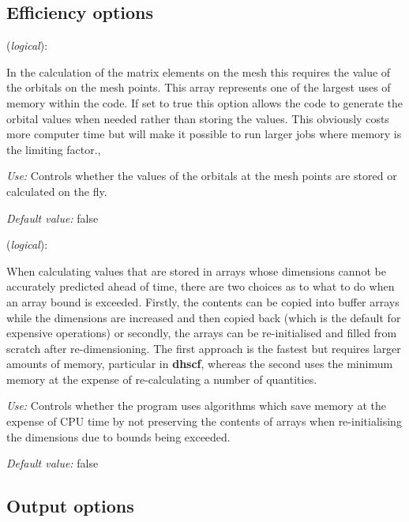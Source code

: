 \documentclass[11pt]{article}
\begin{document}
\subsection{Efficiency options}

\begin{description}
\itemsep 10pt
\parsep 0pt

\item[{\bf DirectPhi}] ({\it logical}):

In the calculation of the matrix elements on the mesh this requires the
value of the orbitals on the mesh points. This array represents one of
the largest uses of memory within the code. If set to true this option
allows the code to generate the orbital values when needed rather than
storing the values. This obviously costs more computer time but will
make it possible to run larger jobs where memory is the limiting factor.,

{\it Use:} Controls whether the values of the orbitals at the mesh points
  are stored or calculated on the fly.

{\it Default value:}  false

\item[{\bf SaveMemory}] ({\it logical}):

When calculating values that are stored in arrays whose dimensions
cannot be accurately predicted ahead of time, there are two choices
as to what to do when an array bound is exceeded. Firstly, the
contents can be copied into buffer arrays while the dimensions
are increased and then copied back (which is the default for
expensive operations) or secondly, the arrays can be re-initialised
and filled from scratch after re-dimensioning. The first approach
is the fastest but requires larger amounts of memory, particular
in {\bf dhscf}, whereas the second uses the minimum memory at the
expense of re-calculating a number of quantities.

{\it Use:} Controls whether the program uses algorithms which save memory
  at the expense of CPU time by not preserving the contents of arrays
  when re-initialising the dimensions due to bounds being exceeded. 

{\it Default value:}  false

\end{description}


\vspace{5pt}
\subsection{Output options}
\end{document}
